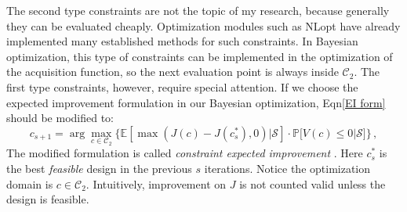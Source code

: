 \documentclass[a4paper,onecolumn]{article}
\theoremstyle{remark}
\begin{document}
\noindent The second type constraints are not the topic of my research, because
generally they can be
evaluated cheaply. Optimization modules such as NLopt\cite{nlopt} have already
implemented many established methods for such constraints.
In Bayesian optimization, this type of constraints can be implemented in 
the optimization of the acquisition function, so the next evaluation point is always inside
$\mathcal{C}_2$.
The first type constraints, however, require special attention.
If we choose the expected improvement formulation in our Bayesian optimization,
Eqn\eqref{EI form} should be modified to:
\begin{equation}
    c_{s+1} = \arg\max_{c\in\mathcal{C}_2} \Big\{ \mathbb{E} 
    \left[\left. \max\left(J(c) - J(c^*_s), 0\right) \right.\Big| \mathcal{S}\right]\cdot
    \mathbb{P}\big[V(c)\le 0 \big| \mathcal{S}\big] \Big\}\,,
    \label{EI form constraint}
\end{equation}
The modified formulation is called \emph{constraint expected improvement}
\cite{constraint Bayesian Opt}.
Here $c_s^*$ is the best \emph{feasible} design in the previous $s$ iterations.
Notice the optimization domain is $c\in\mathcal{C}_2$.
Intuitively, improvement on $J$ is not counted valid unless the design is feasible.
\\
\end{document}
